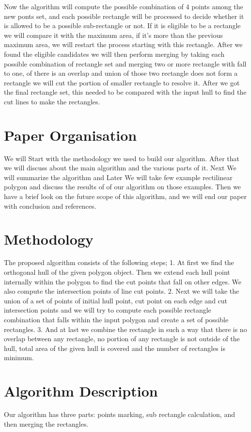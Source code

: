 \documentclass[a4paper,17pt]{article}
\begin{document}
Now the algorithm will compute the possible combination of 4 points among the new ponts set, and each possible rectangle will be processed to decide whether it is allowed to be a possible sub-rectangle or not. If it is eligible to be a rectangle we will compare it with the maximum area, if it's more than the previous maximum area, we will restart the process starting with this rectangle. After we found the eligible candidates we will then perform merging by taking each possible combination of rectangle set and merging two or more rectangle with fall to one, of there is an overlap and union of those two rectangle does not form a rectangle we will cut the portion of smaller rectangle to resolve it. After we got the final rectangle set, this needed to be compared with the input hull to find the cut lines to make the rectangles.

\section{Paper Organisation}
We will Start with the methodology we used to build our algorithm. After that we will discuss about the main algorithm and the various parts of it. Next We will summarize the algorithm and Later We will take few example rectilinear polygon and discuss the results of of our algorithm on those examples. Then we have a brief look on the future scope of this algorithm, and we will end our paper with conclusion and references.

\section{Methodology}
The proposed algorithm consists of the following steps; 1. At first we find the orthogonal hull of the given polygon object. Then we extend each hull point internally within the polygon to find the cut points that fall on other edges. We also compute the intersection points of line cut points. 2. Next we will take the union of a set of points of initial hull point, cut point on each edge and cut intersection points and we will try to compute each possible rectangle combination that falls within the input polygon and create a set of possible rectangles. 3. And at last we combine the rectangle in such a way that there is no overlap between any rectangle, no portion of any rectangle is not outside of the hull, total area of the given hull is covered and the number of rectangles is minimum.

\section{Algorithm Description}
Our algorithm has three parts: points marking, sub rectangle calculation, and then merging the rectangles. 
\end{document}

